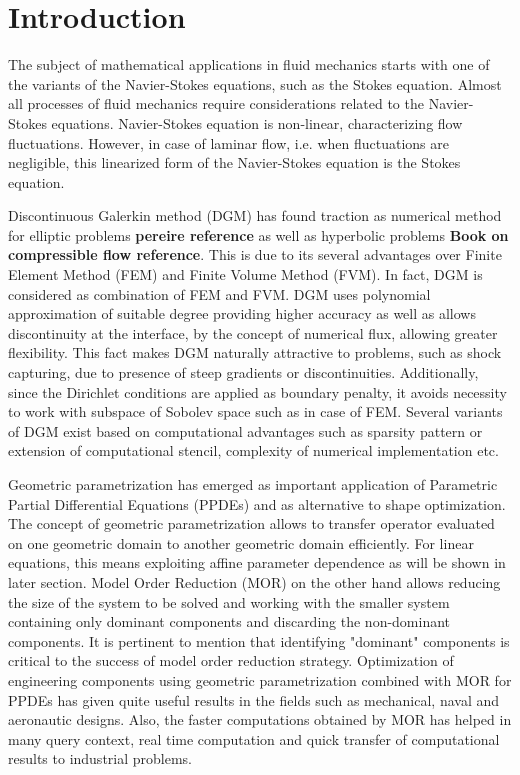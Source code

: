 \documentclass[graybox]{svmult}
\begin{document}
\section{Introduction}
\label{introduction}

The subject of mathematical applications in fluid mechanics starts with one of the variants of the Navier-Stokes equations, such as the Stokes equation. Almost all processes of fluid mechanics require considerations related to the Navier-Stokes equations. Navier-Stokes equation is non-linear, characterizing flow fluctuations. However, in case of laminar flow, i.e. when fluctuations are negligible, this linearized form of the Navier-Stokes equation is the Stokes equation.

Discontinuous Galerkin method (DGM) has found traction as numerical method for elliptic problems \textbf{pereire reference} as well as hyperbolic problems \textbf{Book on compressible flow reference}. This is due to its several advantages over Finite Element Method (FEM) and Finite Volume Method (FVM). In fact, DGM is considered as combination of FEM and FVM. DGM uses polynomial approximation of suitable degree providing higher accuracy as well as allows discontinuity at the interface, by the concept of numerical flux, allowing greater flexibility. This fact makes DGM naturally attractive to problems, such as shock capturing, due to presence of steep gradients or discontinuities. Additionally, since the Dirichlet conditions are applied as boundary penalty, it avoids necessity to work with subspace of Sobolev space such as in case of FEM. Several variants of DGM exist based on computational advantages such as sparsity pattern or extension of computational stencil, complexity of numerical implementation etc.

Geometric parametrization has emerged as important application of Parametric Partial Differential Equations (PPDEs) and as alternative to shape optimization. The concept of geometric parametrization allows to transfer operator evaluated on one geometric domain to another geometric domain efficiently. For linear equations, this means exploiting affine parameter dependence as will be shown in later section. Model Order Reduction (MOR) on the other hand allows reducing the size of the system to be solved and working with the smaller system containing only dominant components and discarding the non-dominant components. It is pertinent to mention that identifying "dominant" components is critical to the success of model order reduction strategy. Optimization of engineering components using geometric parametrization combined with MOR for PPDEs has given quite useful results in the fields such as mechanical, naval and aeronautic designs. Also, the  faster computations obtained by MOR has helped in many query context, real time computation and quick transfer of computational results to industrial problems.
\end{document}
